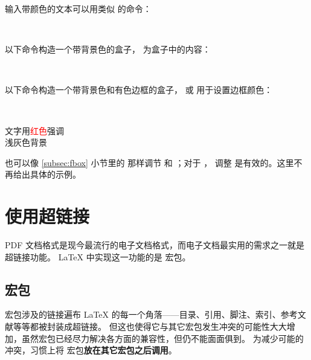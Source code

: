 输入带颜色的文本可以用类似  的命令：
\begin{command}
 \\
\end{command}

以下命令构造一个带背景色的盒子， 为盒子中的内容：
\begin{command}
 \\
\end{command}

以下命令构造一个带背景色和有色边框的盒子， 或  用于设置边框颜色：
\begin{command}
 \\
\end{command}

\begin{example}
\sffamily
文字用\textcolor{red}{红色}强调\\
\colorbox[gray]{0.95}{浅灰色背景} \\
\end{example}

 也可以像 \ref{subsec:fbox} 小节里的  那样调节  和 ；对于 ，
调整  是有效的。这里不再给出具体的示例。

\section{使用超链接}\label{sec:hyperlinks}

PDF 文档格式是现今最流行的电子文档格式，而电子文档最实用的需求之一就是超链接功能。
\LaTeX{} 中实现这一功能的是  宏包。

\subsection{ 宏包}\label{subsec:hyperref}

 宏包涉及的链接遍布 \LaTeX{} 的每一个角落——目录、引用、脚注、索引、参考文献等等都被封装成超链接。
但这也使得它与其它宏包发生冲突的可能性大大增加，虽然宏包已经尽力解决各方面的兼容性，但仍不能面面俱到。
为减少可能的冲突，习惯上将  宏包\textbf{放在其它宏包之后调用}。


